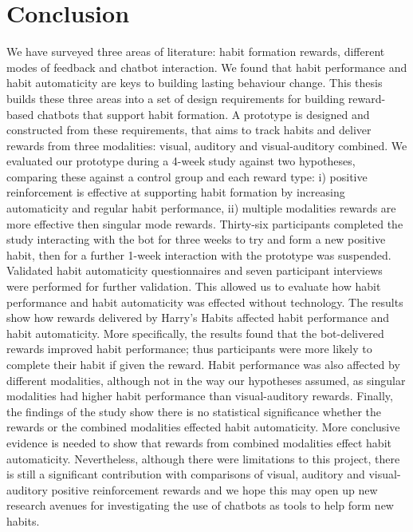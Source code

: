 \section{Conclusion}
We have surveyed three areas of literature: habit formation rewards, different modes of feedback and chatbot interaction. We found that habit performance and habit automaticity are keys to building lasting behaviour change. This thesis builds these three areas into a set of design requirements for building reward-based chatbots that support habit formation.
A prototype is designed and constructed from these requirements, that aims to track habits and deliver rewards from three modalities: visual, auditory and visual-auditory combined.
We evaluated our prototype during a 4-week study against two hypotheses, comparing these against a control group and each reward type: i) positive reinforcement is effective at supporting habit formation by increasing automaticity and regular habit performance, ii) multiple modalities rewards are more effective then singular mode rewards. Thirty-six participants completed the study interacting with the bot for three weeks to try and form a new positive habit, then for a further 1-week interaction with the prototype was suspended. Validated habit automaticity questionnaires and seven participant interviews were performed for further validation. This allowed us to evaluate how habit performance and habit automaticity was effected without technology. The results show how rewards delivered by Harry's Habits affected habit performance and habit automaticity.
More specifically,
the results found that the bot-delivered rewards improved habit performance; thus participants were more likely to complete their habit if given the reward. Habit performance was also affected by different modalities, although not in the way our hypotheses assumed, as singular modalities had higher habit performance than visual-auditory rewards. Finally, the findings of the study show there is no statistical significance whether the rewards or the combined modalities effected habit automaticity. More conclusive evidence is needed to show that rewards from combined modalities effect habit automaticity. Nevertheless, although there were limitations to this project, there is still a significant contribution with comparisons of visual, auditory and visual-auditory positive reinforcement rewards and we hope this may open up new research avenues for investigating the use of chatbots as tools to help form new habits.
